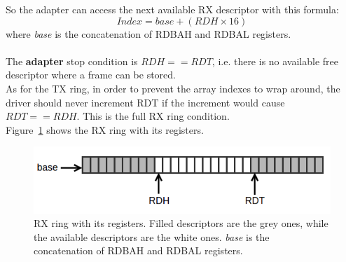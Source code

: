 \documentclass[a4paper, 12pt, titlepage]{report}
\begin{document}
So the adapter can access the next available RX descriptor with this formula:
$$Index = base + (RDH \times 16)$$
where \textit{base} is the concatenation of RDBAH and RDBAL registers.
\\
\\
The \textbf{adapter} stop condition is $RDH == RDT$, i.e. there is no available free descriptor where a frame can be stored.
\\
As for the TX ring, in order to prevent the array indexes to wrap around, the driver should never increment RDT if the increment would cause $RDT == RDH$. This is the full RX ring condition.
\\
Figure~\ref{img:rx_ring} shows the RX ring with its registers.
\begin{figure}[!h] 
	\centering
	\includegraphics[scale=0.6]{img/rx_ring.png}
	\caption{RX ring with its registers. Filled descriptors are the grey ones, while the available descriptors are the white ones. \textit{base} is the concatenation of RDBAH and RDBAL registers.}
	\label{img:rx_ring}
\end{figure}
\end{document}
